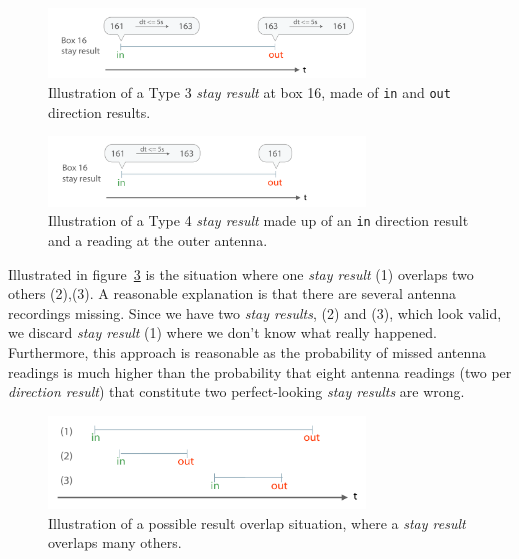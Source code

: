 \begin{figure}[htpb]
\begin{center}
  \includegraphics[width=0.75\textwidth]{assets/pdf/stay_result_type_3_schema.pdf}
  \caption[Illustration of a type 3 \textit{stay result}]{Illustration of a Type 3 \textit{stay result} at box 16,  made of \lstinline|in| and \lstinline|out| direction results.}
  \label{fig:type_3_stay_result}
\end{center}
\end{figure}

\begin{figure}[htpb]
\begin{center}
  \includegraphics[width=0.75\textwidth]{assets/pdf/stay_result_type_4_schema.pdf}
  \caption[Illustration of a type 4 \textit{stay result}]{Illustration of a Type 4 \textit{stay result} made up of an \lstinline|in| direction result and a reading at the outer antenna.}
  \label{fig:type_4_stay_result}
\end{center}
\end{figure}
  
Illustrated in figure~\ref{fig:result_overlap} is the situation where one \textit{stay result} (1) overlaps two others (2),(3). A reasonable explanation is that there are several antenna recordings missing. Since we have two \textit{stay results}, (2) and (3), which look valid, we discard \textit{stay result} (1) where we don't know what really happened. Furthermore, this approach is reasonable as the probability of missed antenna readings is much higher than the probability that eight antenna readings (two per \textit{direction result}) that constitute two perfect-looking \textit{stay results} are wrong.

\begin{figure}[htpb]
\begin{center}
  \includegraphics[width=0.75\textwidth]{assets/pdf/result_overlaps_schema.pdf}
  \caption[Illustration of a possible result overlap situation]{Illustration of a possible result overlap situation, where a \textit{stay result} overlaps many others.}
  \label{fig:result_overlap}
\end{center}
\end{figure}

